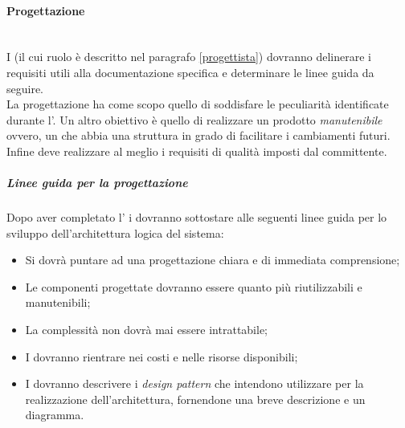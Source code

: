 \paragraph{Progettazione}
	~\\I \progs{} (il cui ruolo è descritto nel paragrafo \ref{progettista}) dovranno delinerare i requisiti utili alla documentazione specifica e determinare le linee guida da seguire.
	~\\La progettazione ha come scopo quello di soddisfare le peculiarità identificate durante l'\AdR. Un altro obiettivo è quello di realizzare un prodotto \emph{manutenibile} ovvero, un 
	 che abbia una struttura in grado di facilitare i cambiamenti futuri.
	\\Infine deve realizzare al meglio i requisiti di qualità imposti dal committente.
	\subparagraph{Linee guida per la progettazione}
	Dopo aver completato l'\AdR{} i \progs{} dovranno sottostare alle seguenti linee guida per lo sviluppo dell'architettura logica del sistema:
	\begin{itemize}
		\item Si dovrà puntare ad una progettazione chiara e di immediata comprensione;
		\item Le componenti progettate dovranno essere quanto più riutilizzabili e manutenibili;
		\item La complessità non dovrà mai essere intrattabile;
		\item I \progs{} dovranno rientrare nei costi e nelle risorse disponibili;
		\item I \progs{} dovranno descrivere i \emph{design pattern} che intendono utilizzare per la realizzazione dell'architettura, fornendone una breve descrizione e un diagramma.
	\end{itemize}
\begin{comment}
	\subparagraph{UML}
	~\\Le tipologie di diagrammi \emph{UML}\ped{G} che verranno adoperate per analizzare, descrivere e specificare le scelte progettuali adottate saranno:
	\begin{itemize}
		\item \textbf{Diagrammi di classe}:
		\item \textbf{Diagrammi di } \emph{\textbf{package}}\ped{G}: documentano le dipendenze tra le classi ed è utile per controllare la complessità strutturale in sistemi medio-grandi;
		\item \textbf{Diagrammi di attività}: modellano un processo e organizzano più entità in un sistema di azioni secondo un determinato flusso. I diagrammi delle attività sono un tipo particolare di \emph{diagramma di stato}\ped{G} che identifica la variazione di stato al verificarsi di alcune condizioni legate ad una o più entità;
		\item \textbf{Diagrammi di sequenza}: descrivono la collaborazione di un gruppo di oggetti che devono implementare collettivamente un comportamento. Sono diagrammi molto semplici, ma che permettono di capire se l'architettura creata viene eseguita.
	\end{itemize}

	\subparagraph{Specifica Tecnica (ST)}
	
	\subparagraph{Definizione di Prodotto (DP)}
\end{comment}
